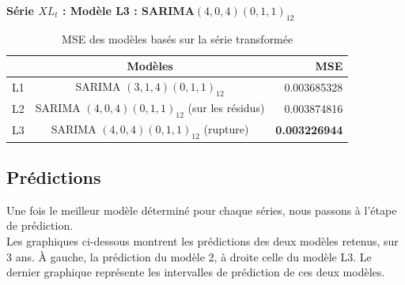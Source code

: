 \documentclass[12pt,a4paper]{book}
\newcommand{\1}{\mathds{1}}
\begin{document}
\noindent
\textbf{Série $XL_t$ : Modèle L3 : SARIMA$(4,0,4)(0,1,1)_{12}$}

\begin{table}[h!]
  \begin{center}
    \caption{MSE des modèles basés sur la série transformée}
    \label{tab:table1}
    \begin{tabular}{l|c|r} 
      \ & \textbf{Modèles} & \textbf{MSE}\\
      \hline
      L1 & SARIMA $(3,1,4)(0,1,1)_{12}$ & 0.003685328\\
      L2 & SARIMA $(4,0,4)(0,1,1)_{12}$ (sur les résidus)& 0.003874816\\
      \rowcolor{LightCyan}
      L3 & SARIMA $(4,0,4)(0,1,1)_{12}$ (rupture)& \textbf{0.003226944}\\
    \end{tabular}
  \end{center}
\end{table}

\vspace{5 mm}
\subsection{Prédictions}

Une fois le meilleur modèle déterminé pour chaque séries, nous passons à l'étape de prédiction.\\
Les graphiques ci-dessous montrent les prédictions des deux modèles retenus, sur 3 ans. À gauche, la prédiction du modèle 2, à droite celle du modèle L3. Le dernier graphique représente les intervalles de prédiction de ces deux modèles.
\end{document}
